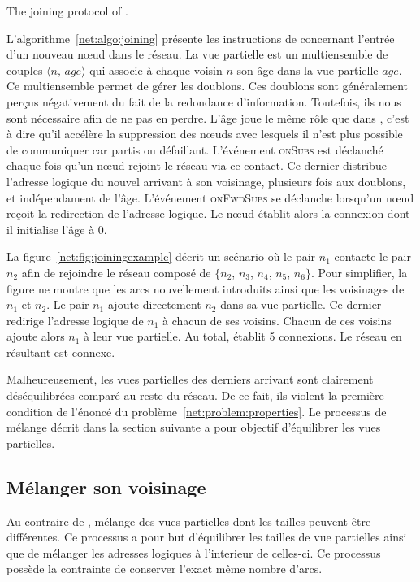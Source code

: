 \begin{algorithm}[h]

\caption{\label{net:algo:joining}The joining protocol of \SPRAY.}
\end{algorithm}

L'algorithme~\ref{net:algo:joining} présente les instructions de \SPRAY
concernant l'entrée d'un nouveau nœud dans le réseau. La vue partielle est un
multiensemble de couples $\langle n,\, age\rangle$ qui associe à chaque voisin
$n$ son âge dans la vue partielle $age$. Ce multiensemble permet de gérer les
doublons. Ces doublons sont généralement perçus négativement du fait de la
redondance d'information. Toutefois, ils nous sont nécessaire afin de ne pas en
perdre. L'âge joue le même rôle que dans \CYCLON, c'est à dire qu'il accélère la
suppression des nœuds avec lesquels il n'est plus possible de communiquer car
partis ou défaillant. L'événement \textsc{onSubs} est déclanché chaque fois qu'un
nœud rejoint le réseau via ce contact. Ce dernier distribue l'adresse logique du
nouvel arrivant à son voisinage, plusieurs fois aux doublons, et indépendament
de l'âge. L'événement \textsc{onFwdSubs} se déclanche lorsqu'un nœud reçoit la
redirection de l'adresse logique. Le nœud établit alors la connexion dont il
initialise l'âge à $0$.

La figure~\ref{net:fig:joiningexample} décrit un scénario où le pair $n_1$
contacte le pair $n_2$ afin de rejoindre le réseau composé de $\{n_2$, $n_3$,
$n_4$, $n_5$, $n_6\}$. Pour simplifier, la figure ne montre que les arcs
nouvellement introduits ainsi que les voisinages de $n_1$ et $n_2$. Le pair
$n_1$ ajoute directement $n_2$ dans sa vue partielle. Ce dernier redirige
l'adresse logique de $n_1$ à chacun de ses voisins.  Chacun de ces voisins
ajoute alors $n_1$ à leur vue partielle. Au total, \SPRAY établit 5
connexions. Le réseau en résultant est connexe.

Malheureusement, les vues partielles des derniers arrivant sont clairement
déséquilibrées comparé au reste du réseau. De ce fait, ils violent la première
condition de l'énoncé du problème~\ref{net:problem:properties}. Le processus de
mélange décrit dans la section suivante a pour objectif d'équilibrer les vues
partielles.

\subsection{Mélanger son voisinage}
\label{net:subsec:shuffling}

Au contraire de \CYCLON, \SPRAY mélange des vues partielles dont les tailles
peuvent être différentes. Ce processus a pour but d'équilibrer les tailles de
vue partielles ainsi que de mélanger les adresses logiques à l'interieur de
celles-ci.  Ce processus possède la contrainte de conserver l'exact même nombre
d'arcs.

